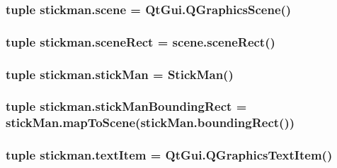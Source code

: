 \subsubsection[{scene}]{\setlength{\rightskip}{0pt plus 5cm}tuple stickman.\+scene = Qt\+Gui.\+Q\+Graphics\+Scene()}\label{namespacestickman_ac4826e705d36794cd0b5e270df055801}
\hypertarget{namespacestickman_a2cb447118bb11d15c1b1316e6cbc0b18}{}
\subsubsection[{scene\+Rect}]{\setlength{\rightskip}{0pt plus 5cm}tuple stickman.\+scene\+Rect = scene.\+scene\+Rect()}\label{namespacestickman_a2cb447118bb11d15c1b1316e6cbc0b18}
\hypertarget{namespacestickman_aa61853c5c059feeabc36dee3af2732fb}{}
\subsubsection[{stick\+Man}]{\setlength{\rightskip}{0pt plus 5cm}tuple stickman.\+stick\+Man = {\bf Stick\+Man}()}\label{namespacestickman_aa61853c5c059feeabc36dee3af2732fb}
\hypertarget{namespacestickman_aae11c6b85a7efe27b0ef9db3ebbd07de}{}
\subsubsection[{stick\+Man\+Bounding\+Rect}]{\setlength{\rightskip}{0pt plus 5cm}tuple stickman.\+stick\+Man\+Bounding\+Rect = stick\+Man.\+map\+To\+Scene(stick\+Man.\+bounding\+Rect())}\label{namespacestickman_aae11c6b85a7efe27b0ef9db3ebbd07de}
\hypertarget{namespacestickman_a7ff8a6268683719b836aa5fe64be9a12}{}
\subsubsection[{text\+Item}]{\setlength{\rightskip}{0pt plus 5cm}tuple stickman.\+text\+Item = Qt\+Gui.\+Q\+Graphics\+Text\+Item()}\label{namespacestickman_a7ff8a6268683719b836aa5fe64be9a12}
\hypertarget{namespacestickman_a9b7b294b6b24ca2dca6ecceee16e3d9b}{}
